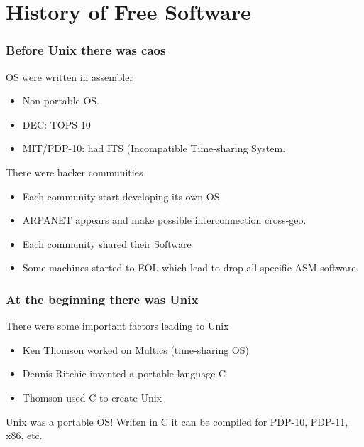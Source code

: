 \documentclass[hyperref={pdfpagelabels=false},xcolor=pst,pdf,fragile]{beamer}
\begin{document}
\section{History of Free Software}

\begin{frame}
  \frametitle{Before Unix there was caos}

  \begin{block}{OS were written in assembler}
	  \begin{itemize}
		  \item Non portable OS.
		  \item DEC: TOPS-10
		  \item MIT/PDP-10: had ITS (Incompatible Time-sharing System.
	  \end{itemize}
  \end{block}

  \pause
  There were hacker communities
  \begin{itemize}
	  \item Each community start developing its own OS.
	  \item ARPANET appears and make possible interconnection cross-geo.
	  \item \alert{Each community shared their Software}
	  \item Some machines started to EOL which lead to drop all specific
		  ASM software.
  \end{itemize}

\end{frame}

\begin{frame}
  \frametitle{At the beginning there was Unix}

  There were some important factors leading to Unix

  \begin{itemize}
	  \item Ken Thomson worked on Multics (time-sharing OS)
	  \item Dennis Ritchie invented a portable language C
	  \item Thomson used C to create Unix
  \end{itemize}

  \pause

  \begin{alertblock}{Unix was a portable OS!}
	  Writen in C it can be compiled for PDP-10, PDP-11, x86, etc.
  \end{alertblock}

\end{frame}
\end{document}
